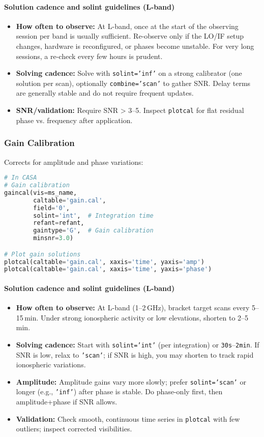 \documentclass[11pt]{article}
\begin{document}
\paragraph{Solution cadence and solint guidelines (L-band)}
\begin{itemize}
    \item \textbf{How often to observe:} At L-band, once at the start of the observing session per band is usually sufficient. Re-observe only if the LO/IF setup changes, hardware is reconfigured, or phases become unstable. For very long sessions, a re-check every few hours is prudent.
    \item \textbf{Solving cadence:} Solve with \texttt{solint='inf'} on a strong calibrator (one solution per scan), optionally \texttt{combine='scan'} to gather SNR. Delay terms are generally stable and do not require frequent updates.
    \item \textbf{SNR/validation:} Require SNR > 3--5. Inspect \texttt{plotcal} for flat residual phase vs. frequency after application.
\end{itemize}

\subsubsection{Gain Calibration}
Corrects for amplitude and phase variations:

\begin{lstlisting}[language=Python]
# In CASA
# Gain calibration
gaincal(vis=ms_name, 
        caltable='gain.cal', 
        field='0', 
        solint='int',  # Integration time
        refant=refant, 
        gaintype='G',  # Gain calibration
        minsnr=3.0)

# Plot gain solutions
plotcal(caltable='gain.cal', xaxis='time', yaxis='amp')
plotcal(caltable='gain.cal', xaxis='time', yaxis='phase')
\end{lstlisting}

\paragraph{Solution cadence and solint guidelines (L-band)}
\begin{itemize}
    \item \textbf{How often to observe:} At L-band (1--2\,GHz), bracket target scans every 5--15\,min. Under strong ionospheric activity or low elevations, shorten to 2--5\,min.
    \item \textbf{Solving cadence:} Start with \texttt{solint='int'} (per integration) or \texttt{30s}--\texttt{2min}. If SNR is low, relax to \texttt{'scan'}; if SNR is high, you may shorten to track rapid ionospheric variations.
    \item \textbf{Amplitude:} Amplitude gains vary more slowly; prefer \texttt{solint='scan'} or longer (e.g., \texttt{'inf'}) after phase is stable. Do phase-only first, then amplitude+phase if SNR allows.
    \item \textbf{Validation:} Check smooth, continuous time series in \texttt{plotcal} with few outliers; inspect corrected visibilities.
\end{itemize}
\end{document}
